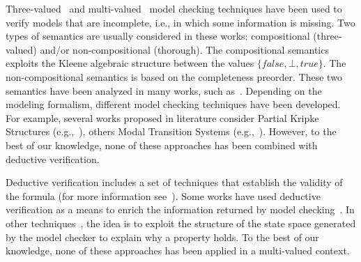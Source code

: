 Three-valued~\cite{larsen1988modal,godefroid2001abstraction,bruns1999model,bruns2000model,benevs2009checking,godefroid2011ltl} and multi-valued~\cite{gurfinkel2003multi,bruns2004MCmultivalued} model checking techniques have been used to verify models that are incomplete, i.e., in which some information is missing. 
Two types of semantics are usually considered in these works: compositional (three-valued) and/or non-compositional (thorough).
The compositional semantics exploits the Kleene algebraic structure between the values $\{false, \bot, true \}$. 
The non-compositional semantics is  based on the completeness preorder.
These two semantics have been analyzed in many works, such as~\cite{gurfinkel2005thorough,godefroid2005MCvsGMC}.
Depending on the modeling formalism, different model checking techniques have been developed. For example, several works proposed in literature consider Partial Kripke Structures (e.g.,~\cite{bruns1999model,bruns2000model,godefroid2011ltl,gurfinkel2003multi,bruns2004MCmultivalued}), others Modal Transition Systems (e.g.,~\cite{larsen1988modal,godefroid2001abstraction}). 
However, to the best of our knowledge, none of these approaches has been combined with deductive verification.  

Deductive verification includes a set of techniques that establish the validity of the formula (for more information see~\cite{manna2012temporal}).
Some works have used deductive verification as a means to enrich the information returned by model checking~\cite{gurfinkel2003proof,clarke1995efficient}.
In other techniques~\cite{namjoshi2001certifying,cleaveland2002evidence,rajan1995integration}, the idea is to exploit the structure of the state space generated by the model checker to explain why a property holds.
To the best of our knowledge, none of these approaches has been applied in a multi-valued context.


